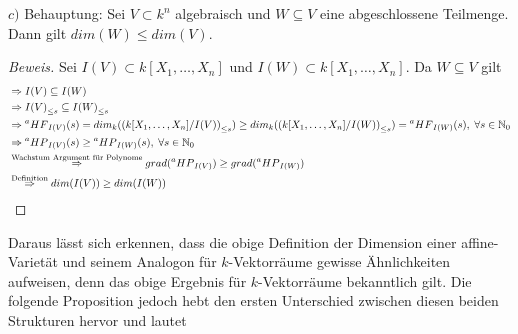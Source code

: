 \documentclass{article}
\newcommand*{\R}{k[X_{1},\ldots,X_{n}]}
\newcommand*{\indx}[2]{{#1}_{#2}}
\newcommand*{\N}{\mathbb{N}_0}
\newcommand*{\hf}[1]{$\prescript{a}{}{HF}_{#1}$}
\newcommand*{\hp}[1]{$\prescript{a}{}{HP}_{#1}$}
\begin{document}
$c)$ Behauptung: Sei $V\subset k^n$ algebraisch und $W\subseteq V$ eine abgeschlossene Teilmenge. Dann gilt $dim(W)\leq dim(V)$.\\

\begin{proof}[Beweis]
	Sei $I(V)\subset\R$ und $I(W)\subset\R$. Da $W\subseteq V$ gilt
	\begin{align*}
	&\Rightarrow I(V)\subseteq I(W)\\ & 
	\Rightarrow \indx{I(V)}{\leq s}\subseteq \indx{I(W)}{\leq s}\\&
	\Rightarrow \textnormal{\hf{I(V)}}(s)=\indx{dim}{k}(\indx{(\R/I(V))}{\leq s})\geq \indx{dim}{k}(\indx{(\R/I(W))}{\leq s})= \textnormal{\hf{I(W)}}(s),\; \forall s\in \N \\&
	\Rightarrow \textnormal{\hp{I(V)}}(s) \geq \textnormal{\hp{I(W)}}(s),\; \forall s\in \N \\&
	\stackrel{\textnormal{Wachstum Argument für Polynome}}{\Rightarrow}grad(\textnormal{\hp{I(V)}}) \geq grad(\textnormal{\hp{I(W)}}) \\&
	\stackrel{\textnormal{Definition}}{\Rightarrow} dim(I(V))\geq dim(I(W))
	\end{align*}
\end{proof}
Daraus lässt sich erkennen, dass die obige Definition der Dimension einer affine-Varietät und seinem Analogon für $k$-Vektorräume gewisse Ähnlichkeiten aufweisen, denn das obige Ergebnis für $k$-Vektorräume bekanntlich gilt. Die folgende Proposition jedoch hebt den ersten Unterschied zwischen diesen beiden Strukturen hervor und lautet
\end{document}
